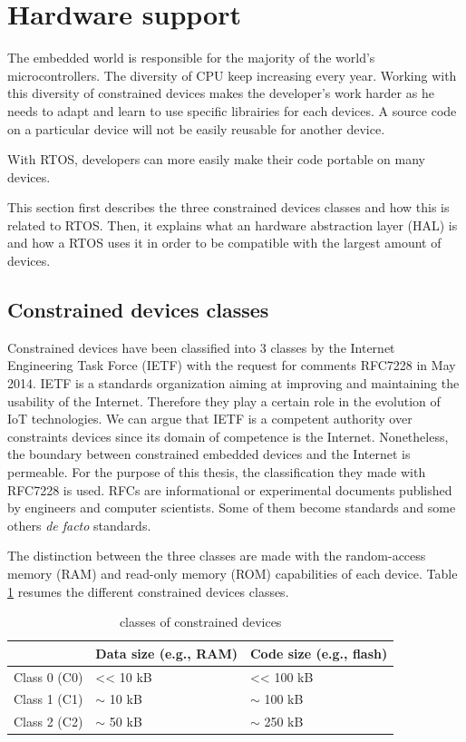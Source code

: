 \section{Hardware support}

The embedded world is responsible for the majority of the world's microcontrollers.
The diversity of CPU keep increasing every year.
Working with this diversity of constrained devices makes the developer's work harder as he needs to adapt and learn to use specific librairies for each devices.
A source code on a particular device will not be easily reusable for another device.

With RTOS, developers can more easily make their code portable on many devices.

This section first describes the three constrained devices classes and how this is related to RTOS.
Then, it explains what an hardware abstraction layer (HAL) is and how a RTOS uses it in order to be compatible with the largest amount of devices.

\subsection{Constrained devices classes}

Constrained devices have been classified into 3 classes by the Internet Engineering Task Force (IETF) with the request for comments RFC7228\cite{RFC7228} in May 2014.
IETF is a standards organization aiming at improving and maintaining the usability of the Internet.
Therefore they play a certain role in the evolution of IoT technologies.
We can argue that IETF is a competent authority over constraints devices since its domain of competence is the Internet.
Nonetheless, the boundary between constrained embedded devices and the Internet is permeable.
For the purpose of this thesis, the classification they made with RFC7228 is used.
RFCs are informational or experimental documents published by engineers and computer scientists.
Some of them become standards and some others \textit{de facto} standards.

The distinction between the three classes are made with the random-access memory (RAM) and read-only memory (ROM) capabilities of each device.
Table \ref{tab:constrained-devices-classes} resumes the different constrained devices classes.

\begin{table}[!h]
  \centering
  \begin{tabular}{|l|l|l|}
  \hline
   & Data size (e.g., RAM) & Code size (e.g., flash) \\ \hline
  Class 0 (C0) & \textless{}\textless{} 10 kB & \textless{}\textless{} 100 kB \\ %
  Class 1 (C1) & $\sim$ 10 kB & $\sim$ 100 kB \\ %
  Class 2 (C2) & $\sim$ 50 kB & $\sim$ 250 kB \\ \hline
  \end{tabular}
  \caption{classes of constrained devices}
  \label{tab:constrained-devices-classes}
\end{table}

